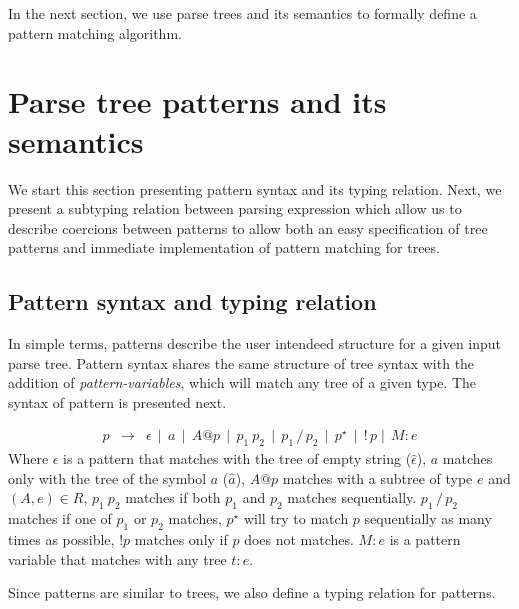 In the next section, we use parse trees and its semantics to formally define
a pattern matching algorithm.

\section{Parse tree patterns and its semantics}\label{sec:patterns}

We start this section presenting pattern syntax and its typing relation.
Next, we present a subtyping relation between parsing expression which allow us
to describe coercions between patterns to allow both an easy specification of tree
patterns and immediate implementation of pattern matching for trees.

\subsection{Pattern syntax and typing relation}

In simple terms, patterns describe the user intendeed structure for a given
input parse tree. Pattern syntax shares the same structure of tree syntax with
the addition of \emph{pattern-variables}, which will match any tree of a given type.
The syntax of pattern is presented next.

\[
    \begin{array}{lcl}
        p & \to & \epsilon \, \mid \, a \, \mid \, A@p\, \mid \,p_1\:p_2\,
                \mid\,p_1\,/\,p_2\, \mid \,p^\star\, \mid \,!\,p
                \mid \, M : e
    \end{array}
\]
Where \(\epsilon\) is a pattern that matches with the tree of
empty string (\(\hat{\epsilon}\)),
\(a\) matches only with the tree of the symbol \(a\) (\(\hat{a}\)), \(A@p\) matches
with a subtree of type \(e\) and \((A, e) \in R\), \(p_1\:p_2\) matches if both
\(p_1\) and \(p_2\) matches sequentially. \(p_1\,/\,p_2\) matches if one of \(p_1\)
or \(p_2\) matches, \(p^\star\) will try to match \(p\) sequentially as many times
as possible, \(!p\) matches only if \(p\) does not matches. \(M : e\) is a pattern
variable that matches with any tree \(t : e\).

Since patterns are similar to trees, we also define a typing relation for patterns.

